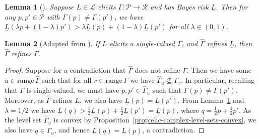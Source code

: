 \documentclass{article} %
\newcommand{\range}{\mathrm{range}\,}
\renewcommand{\L}{\mathcal{L}}
\newcommand{\R}{\mathcal{R}}
\renewcommand{\P}{\mathcal{P}}
\newcommand{\lbar}{\underline{L}} %
\newtheorem{lemma}{Lemma}
\begin{document}
\begin{lemma}[{\citet[Lemma 8]{frongillo2020elicitation}}]
  \label{lem:elic-complex-bayes-concave}
  Suppose $L \in \L$ elicits $\Gamma:\P\to\R$ and has Bayes risk $\lbar$.
  Then for any $p,p'\in\P$ with $\Gamma(p)\neq\Gamma(p')$, we have $\lbar(\lambda p + (1-\lambda) p') > \lambda \lbar(p) + (1-\lambda) \lbar(p')$ for all $\lambda\in(0,1)$.
\end{lemma}

\begin{lemma}[{Adapted from \citet[Theorem 4]{frongillo2020elicitation}}]
  \label{lem:bayes-risk-lower-bound}
  If $L$ elicits a single-valued $\Gamma$, and $\hat\Gamma$ refines $\lbar$, then $\hat\Gamma$ refines $\Gamma$.
\end{lemma}
\begin{proof}
  Suppose for a contradiction that $\hat\Gamma$ does not refine $\Gamma$.
  Then we have some $u\in\range\hat\Gamma$ such that for all $r\in\range\Gamma$ we have $\hat\Gamma_u \not\subseteq \Gamma_r$.
  In particular, recalling that $\Gamma$ is single-valued, we must have $p,p'\in\hat\Gamma_u$ such that $\Gamma(p) \neq \Gamma(p')$.
  Moreover, as $\hat\Gamma$ refines $\lbar$, we also have $\lbar(p) = \lbar(p')$.
  From Lemma~\ref{lem:elic-complex-bayes-concave} and $\lambda=1/2$ we have $\lbar(q) > \tfrac 1 2 \lbar(p) + \tfrac 1 2 \lbar(p') = \lbar(p)$, where $q = \tfrac 1 2 p + \tfrac 1 2 p'$.
  As the level set $\hat\Gamma_u$ is convex by Proposition~\ref{prop:elic-complex-level-sets-convex}, we also have $q \in \hat\Gamma_u$, and hence $\lbar(q)=\lbar(p)$, a contradiction.
\end{proof}
\end{document}
